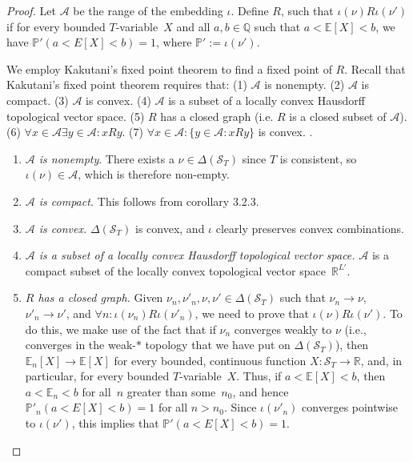 \documentclass[12pt]{article}
\newcommand{\PP}{\mathbb{P}}
\newcommand{\EE}{\mathbb{E}}
\newcommand{\RR}{\mathbb{R}}
\newcommand{\QQ}{\mathbb{Q}}
\newcommand{\cA}{\mathcal{A}}
\newcommand{\cS}{\mathcal{S}}
\newcommand{\Tvar}{$T$-variable}
\theoremstyle{plain}
\theoremstyle{definition}
\theoremstyle{remark}
\begin{document}
\begin{proof}
Let $\cA$ be the range of the embedding $\iota$. Define $R$, such that $\iota(\nu)R\iota(\nu')$ if for every bounded \Tvar{}~$X$ and all $a,b\in\QQ$ such that $a<\EE[X]<b$, we have $\PP'( a < E[X] <  b)= 1$, where $\PP':=\iota(\nu')$.

We employ Kakutani's fixed point theorem to find a fixed point of $R$. Recall that Kakutani's fixed point theorem requires that:
(1) $\mathcal{A}$ is nonempty.
(2) $\mathcal{A}$ is compact.
(3) $\mathcal{A}$ is convex.
(4) $\mathcal{A}$ is a subset of a locally convex Hausdorff topological vector space.
(5) $R$ has a closed graph (i.e. $R$ is a closed subset of $\cA$).
(6) $\forall x\in\cA \exists y\in\cA : xRy$.
(7) $\forall x\in\cA:\{y \in \mathcal{A}: xRy\}$ is convex.
\cite{kakutani41}.

\begin{enumerate}
\item \emph{$\mathcal{A}$ is nonempty}. There exists a $\nu\in\Delta(\cS_T)$ since $T$ is consistent, so $\iota(\nu)\in\cA$, which is therefore non-empty.

\item \emph{$\mathcal{A}$ is compact.} This follows from corollary 3.2.3.

\item \emph{$\mathcal{A}$ is convex.} $\Delta(\cS_T)$ is convex, and $\iota$ clearly preserves convex combinations.

\item \emph{$\mathcal{A}$ is a subset of a locally convex Hausdorff topological vector space.} $\mathcal{A}$ is a compact subset of the locally convex topological vector space~$\RR^{L'}$.

\item \emph{$R$ has a closed graph.} Given $\nu_n,\nu'_n,\nu,\nu'\in\Delta(\cS_T)$ such that $\nu_n\to\nu$, $\nu'_n\to\nu'$, and $\forall n : \iota(\nu_n)R\iota(\nu'_n)$, we need to prove that $\iota(\nu)R\iota(\nu')$. 
To do this, we make use of the fact that if $\nu_n$ converges weakly to $\nu$ (i.e., converges in the weak-$*$ topology that we have put on $\Delta(\cS_T)$), then $\EE_n[X]\to\EE[X]$ for every bounded, continuous function $X : \cS_T\to\RR$, and, in particular, for every bounded \Tvar{}~$X$. 
Thus, if $a < \EE[X] < b$, then $a < \EE_n < b$ for all~$n$ greater than some~$n_0$, and hence $\PP'_n( a < E[X] <  b) = 1$ for all $n>n_0$.
Since $\iota(\nu'_n)$ converges pointwise to $\iota(\nu')$, this implies that $\PP'( a < E[X] <  b) = 1$.


\end{enumerate}
\end{proof}
\end{document}
